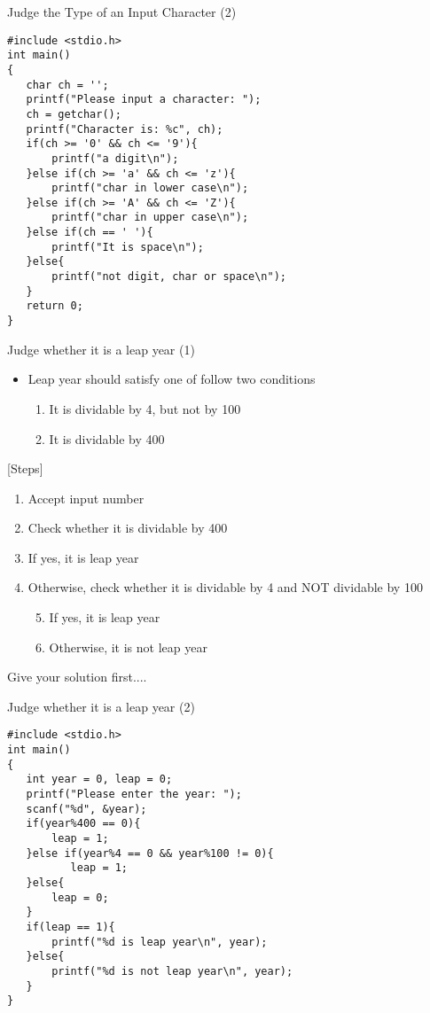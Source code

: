 \begin{frame}[fragile]{Judge the Type of an Input Character (2)}
\begin{lstlisting}[basicstyle=\footnotesize]
#include <stdio.h>
int main()
{
   char ch = '';
   printf("Please input a character: ");
   ch = getchar();
   printf("Character is: %c", ch);
   if(ch >= '0' && ch <= '9'){
       printf("a digit\n");
   }else if(ch >= 'a' && ch <= 'z'){
       printf("char in lower case\n");
   }else if(ch >= 'A' && ch <= 'Z'){
       printf("char in upper case\n");
   }else if(ch == ' '){
       printf("It is space\n");
   }else{
       printf("not digit, char or space\n");
   }
   return 0;
}
\end{lstlisting}

\end{frame}


\begin{frame}[fragile]{Judge whether it is a leap year (1)}
\begin{itemize}
	\item {Leap year should satisfy one of follow two conditions}
	\begin{enumerate}
		\item {It is dividable by 4, but not by 100}
		\item {It is dividable by 400}
	\end{enumerate}
\end{itemize}

[Steps]
\begin{enumerate}
	\setcounter{enumi}{0}
	\item {Accept input number}	
	\item {Check whether it is dividable by 400}
	\item {If yes, it is leap year}
	\item {Otherwise, check whether it is dividable by 4 and NOT dividable by 100}
	\begin{enumerate}
	\setcounter{enumi}{4}
	\item {If yes, it is leap year}
	\item {Otherwise, it is not leap year}
	\end{enumerate}
\end{enumerate}
Give your solution first....
\end{frame}

\begin{frame}[fragile]{Judge whether it is a leap year (2)}
\vspace{-0.1in}
\begin{lstlisting}[basicstyle=\footnotesize]
#include <stdio.h>
int main()
{
   int year = 0, leap = 0;
   printf("Please enter the year: ");
   scanf("%d", &year);
   if(year%400 == 0){
       leap = 1;
   }else if(year%4 == 0 && year%100 != 0){
          leap = 1;
   }else{
       leap = 0;
   }
   if(leap == 1){
       printf("%d is leap year\n", year);
   }else{
       printf("%d is not leap year\n", year);
   }
}
\end{lstlisting}

\end{frame}

